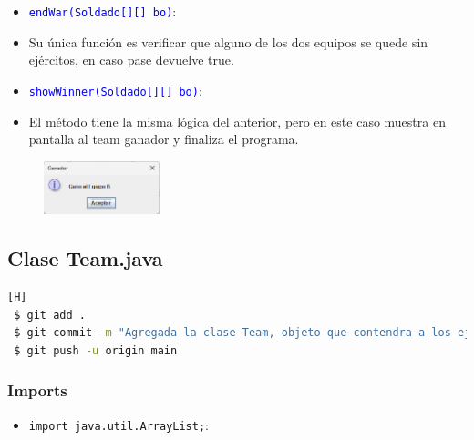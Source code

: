 \documentclass{article}
\begin{document}

\newpage
\begin{itemize}
    \item \texttt{\textcolor{blue}{endWar(Soldado[][] bo)}}: 
    \item Su única función es verificar que alguno de los dos equipos se quede sin ejércitos, en caso pase devuelve true.
\end{itemize}

\begin{itemize}
    \item \texttt{\textcolor{blue}{showWinner(Soldado[][] bo)}}: 
    \item El método tiene la misma lógica del anterior, pero en este caso muestra en pantalla al team ganador y finaliza el programa.
\end{itemize}

\begin{figure}[H]
    \centering
    \includegraphics[width=0.3\textwidth,keepaspectratio]{img/vj5.png}
    \caption{}
\end{figure}

\newpage

\subsection{Clase Team.java}
\begin{lstlisting}[language=bash,caption={Commit \href{https://github.com/hernanchoquehuanca/fp2-23b/commit/b88b62a5f399f7d5f245434c901abf128f9c0705}{b88b62a}: Agregando la clase Team
}][H]
 $ git add .
 $ git commit -m "Agregada la clase Team, objeto que contendra a los ejercitos"			
 $ git push -u origin main
\end{lstlisting}
\subsubsection{Imports}
\begin{itemize}
    \item \texttt{import java.util.ArrayList;}: 
\end{itemize}

\end{document}
